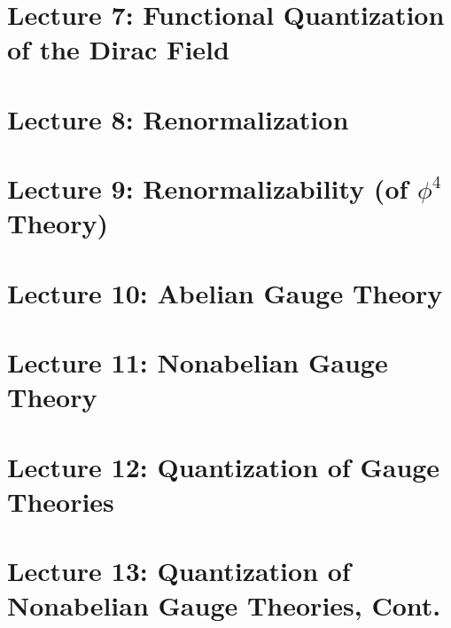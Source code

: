 \documentclass[10pt]{article}
\begin{document}
\section*{Lecture 7: Functional Quantization of the Dirac Field}
\label{sec: lec7}



\clearpage

\section*{Lecture 8: Renormalization}
\label{sec: lec8}



\clearpage

\section*{Lecture 9: Renormalizability (of $\phi^4$ Theory)}
\label{sec: lec9}



\clearpage

\section*{Lecture 10: Abelian Gauge Theory}
\label{sec: lec10}



\clearpage

\section*{Lecture 11: Nonabelian Gauge Theory}
\label{sec: lec11}



\clearpage

\section*{Lecture 12: Quantization of Gauge Theories}
\label{sec: lec12}



\clearpage

\section*{Lecture 13: Quantization of Nonabelian Gauge Theories, Cont.}
\label{sec: lec13}
\end{document}

